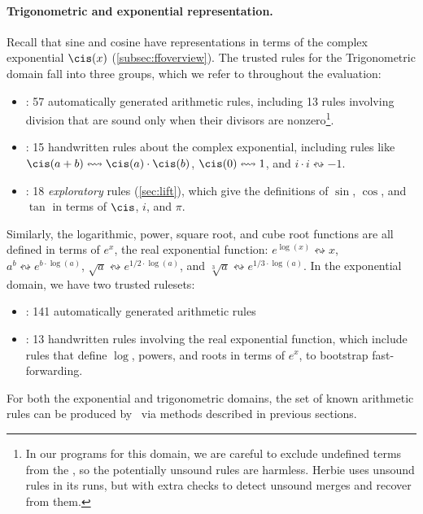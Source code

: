 \paragraph*{Trigonometric and exponential representation.}
\label{eval:trig-rep}

Recall that sine and cosine have representations
  in terms of the complex exponential $\cis(x)$
  (\autoref{subsec:ffoverview}).
The trusted rules for the Trigonometric domain fall into three groups, which we refer
  to throughout the evaluation:
\begin{itemize}
  \item {}: 57 automatically generated arithmetic rules,
    including 13 rules involving division that are sound only when their divisors are nonzero\footnote{
      In our \enumo programs for this domain, we are careful to exclude undefined terms from the \egraph,
      so the potentially unsound rules are harmless. Herbie uses unsound rules in its \eqsat
      runs, but with extra checks to detect unsound merges and recover from them.
    }.
  \item {}: 15 handwritten rules about the complex exponential, including rules like
  $\cis(a + b) \leftrightsquigarrow \cis(a) \cdot \cis(b)$,
  $\cis(0) \leftrightsquigarrow 1$, and $i \cdot i \leftrightsquigarrow -1$.
  \item {}: 18 \textit{exploratory} rules (\autoref{sec:lift}), which
    give the definitions of $\sin$, $\cos$, and $\tan$ in terms of $\cis$, $i$, and $\pi$.
\end{itemize}

Similarly, the logarithmic, power, square root,
  and cube root functions are all defined in terms of $e^x$,
  the real exponential function:
  $e^{\log(x)} \leftrightsquigarrow x$,
  $a^b \leftrightsquigarrow e^{b \cdot \log(a)}$,
  $\sqrt{a} \leftrightsquigarrow e^{1/2 \cdot \log(a)}$, and
  $\sqrt[3]{a} \leftrightsquigarrow e^{1/3 \cdot \log(a)}$.
In the exponential domain, we have two trusted rulesets:
\begin{itemize}
  \item {}: 141 automatically generated arithmetic rules
  \item {}: 13 handwritten rules involving the real exponential function,
    which include rules that define
    $\log$, powers, and roots in terms of $e^x$,
  to bootstrap fast-forwarding.
\end{itemize}
For both the exponential and trigonometric domains,
  the set of known arithmetic rules can be produced by
  \enumo~via methods described in previous sections.

